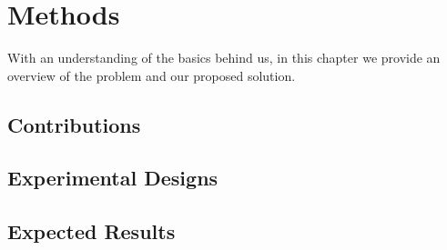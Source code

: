 \chapter{Methods}\label{ch:approach}
With an understanding of the basics behind us, in this chapter we provide an overview of the problem and our proposed solution.

\section{Contributions}


\section{Experimental Designs} \label{experimental_design}

\section{Expected Results}




